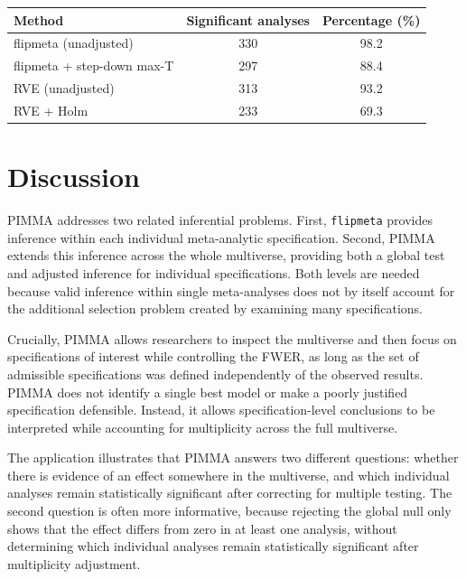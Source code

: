 \documentclass[
  man,
  longtable,
  nolmodern,
  notxfonts,
  notimes,
  colorlinks=true,linkcolor=blue,citecolor=blue,urlcolor=blue]{apa7}
\begin{document}
\begin{table}

{\caption{{Analysis-level inferential results across the CBT depression
multiverse (\(S = 336\) unique analyses), comparing unadjusted and
multiplicity-adjusted inference using flipmeta and
RVE.}{\label{tbl-inference-comparison}}}
\vspace{-20pt}}

\begin{longtable}[]{@{}lcc@{}}
\toprule\noalign{}
Method & Significant analyses & Percentage (\%) \\
\midrule\noalign{}
\endhead
\bottomrule\noalign{}
\endlastfoot
flipmeta (unadjusted) & 330 & 98.2 \\
flipmeta + step-down max-T & 297 & 88.4 \\
RVE (unadjusted) & 313 & 93.2 \\
RVE + Holm & 233 & 69.3 \\
\end{longtable}

\end{table}

\section{Discussion}\label{discussion}

PIMMA addresses two related inferential problems. First,
\texttt{flipmeta} provides inference within each individual
meta-analytic specification. Second, PIMMA extends this inference across
the whole multiverse, providing both a global test and adjusted
inference for individual specifications. Both levels are needed because
valid inference within single meta-analyses does not by itself account
for the additional selection problem created by examining many
specifications.

Crucially, PIMMA allows researchers to inspect the multiverse and then
focus on specifications of interest while controlling the FWER, as long
as the set of admissible specifications was defined independently of the
observed results. PIMMA does not identify a single best model or make a
poorly justified specification defensible. Instead, it allows
specification-level conclusions to be interpreted while accounting for
multiplicity across the full multiverse.

The application illustrates that PIMMA answers two different questions:
whether there is evidence of an effect somewhere in the multiverse, and
which individual analyses remain statistically significant after
correcting for multiple testing. The second question is often more
informative, because rejecting the global null only shows that the
effect differs from zero in at least one analysis, without determining
which individual analyses remain statistically significant after
multiplicity adjustment.
\end{document}
